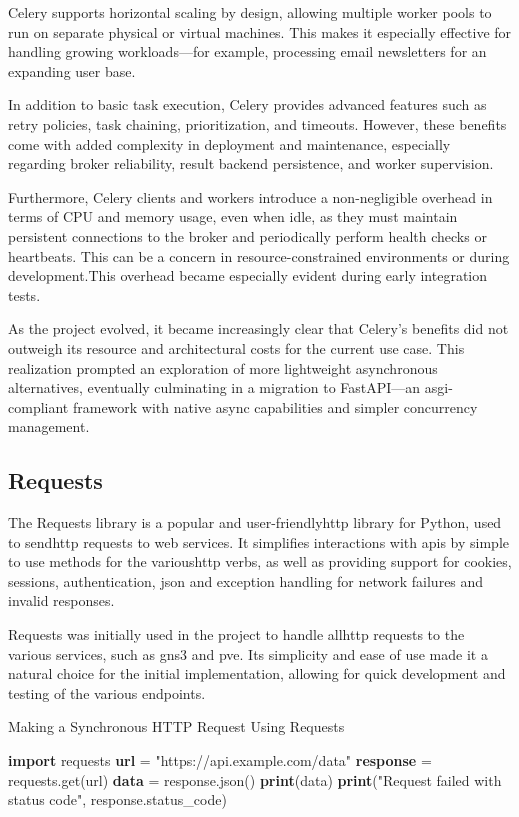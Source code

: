   Celery supports horizontal scaling by design, allowing multiple worker pools to run on separate physical or virtual machines. 
  This makes it especially effective for handling growing workloads—for example, processing email newsletters for an expanding 
  user base.

  In addition to basic task execution, Celery provides advanced features such as retry policies, task chaining, prioritization, 
  and timeouts. However, these benefits come with added complexity in deployment and maintenance, especially regarding broker 
  reliability, result backend persistence, and worker supervision.

  Furthermore, Celery clients and workers introduce a non-negligible overhead in terms of CPU and memory usage, even when 
  idle, as they must maintain persistent connections to the broker and periodically perform health checks or heartbeats. 
  This can be a concern in resource-constrained environments or during development.This overhead became especially evident 
  during early integration tests.

  As the project evolved, it became increasingly clear that Celery's benefits did not outweigh its resource and 
  architectural costs for the current use case. This realization prompted an exploration of more lightweight asynchronous 
  alternatives, eventually culminating in a migration to FastAPI—an \ac{asgi}-compliant framework with native async capabilities 
  and simpler concurrency management.


\subsection{Requests}
  The Requests\cite{requests2025} library is a popular and user-friendly\ac{http} library for Python, used to send\ac{http} 
  requests to web services. It simplifies interactions with \ac{api}s by simple to use methods for the various\ac{http} verbs, 
  as well as providing support for cookies, sessions, authentication, \ac{json} and exception handling for network failures and 
  invalid responses.

  Requests was initially used in the project to handle all\ac{http} requests to the various services, such as
  \ac{gns3} and \ac{pve}. Its simplicity and ease of use made it a natural choice for the initial implementation, allowing
  for quick development and testing of the various endpoints.

  \begin{algorithm}
    \caption{Making a Synchronous HTTP Request Using Requests}\label{requests-basic}
    \begin{algorithmic}[1]
      \State \textbf{import} requests
      \State
      \State \textbf{url} = "https://api.example.com/data"
      \State \textbf{response} = requests.get(url)
      \State
        \State \textbf{data} = response.json()
        \State \textbf{print}(data)
      \Else
        \State \textbf{print}("Request failed with status code", response.status\_code)
      \EndIf
    \end{algorithmic}
  \end{algorithm}

